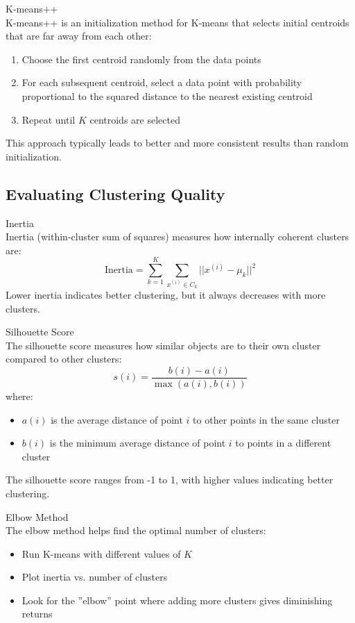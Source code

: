 \begin{definition}{K-means++}\\
K-means++ is an initialization method for K-means that selects initial centroids that are far away from each other:
\begin{enumerate}
    \item Choose the first centroid randomly from the data points
    \item For each subsequent centroid, select a data point with probability proportional to the squared distance to the nearest existing centroid
    \item Repeat until $K$ centroids are selected
\end{enumerate}
This approach typically leads to better and more consistent results than random initialization.
\end{definition}



\subsection{Evaluating Clustering Quality}

\begin{definition}{Inertia}\\
Inertia (within-cluster sum of squares) measures how internally coherent clusters are:
\[\text{Inertia} = \sum_{k=1}^{K} \sum_{x^{(i)} \in C_k} ||x^{(i)} - \mu_k||^2\]
Lower inertia indicates better clustering, but it always decreases with more clusters.
\end{definition}

\begin{definition}{Silhouette Score}\\
The silhouette score measures how similar objects are to their own cluster compared to other clusters:
\[s(i) = \frac{b(i) - a(i)}{\max(a(i), b(i))}\]
where:
\begin{itemize}
    \item $a(i)$ is the average distance of point $i$ to other points in the same cluster
    \item $b(i)$ is the minimum average distance of point $i$ to points in a different cluster
\end{itemize}
The silhouette score ranges from -1 to 1, with higher values indicating better clustering.
\end{definition}

\begin{concept}{Elbow Method}\\
The elbow method helps find the optimal number of clusters:
\begin{itemize}
    \item Run K-means with different values of $K$
    \item Plot inertia vs. number of clusters
    \item Look for the ''elbow'' point where adding more clusters gives diminishing returns
\end{itemize}
\end{concept}

